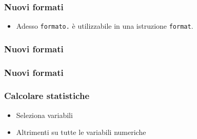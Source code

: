 \documentclass[12pt]{beamer}
\begin{document}



\begin{frame}[containsverbatim]\frametitle{Nuovi formati}
  \begin{itemize}
  \item
    Adesso \texttt{formato.} {\`e} utilizzabile in una istruzione  \texttt{format}.
  \end{itemize}
\end{frame}


\begin{frame}[containsverbatim]\frametitle{Nuovi formati}
\end{frame}


\begin{frame}[containsverbatim]\frametitle{Nuovi formati}
\end{frame}




\begin{frame}[containsverbatim]\frametitle{Calcolare statistiche}
  \begin{itemize}
  \item
    Seleziona variabili
  \item
    Altrimenti su tutte le variabili numeriche
  \end{itemize}
\end{frame}
\end{document}

